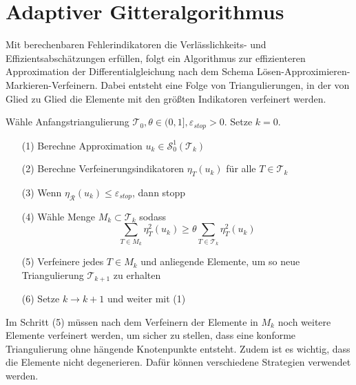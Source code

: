 \chapter{Adaptiver Gitteralgorithmus}
Mit berechenbaren Fehlerindikatoren die Verlässlichkeits- und Effizientsabschätzungen erfüllen, folgt ein Algorithmus zur effizienteren Approximation der Differentialgleichung nach dem Schema Lösen-Approximieren-Markieren-Verfeinern. Dabei entsteht eine Folge von Triangulierungen, in der von Glied zu Glied die Elemente mit den größten Indikatoren verfeinert werden.
\begin{algorithmus}
	Wähle Anfangstriangulierung $\mathscr{T}_0, \theta\in (0,1],\varepsilon_{stop}>0$. Setze $k=0$.
	\begin{itemize}
		\item[(1)] Berechne Approximation $u_k\in\mathscr{S}_0^1(\mathscr{T}_k)$
		\item[(2)] Berechne Verfeinerungsindikatoren $\eta_T(u_k)$ für alle $T\in\mathscr{T}_k$
		\item[(3)] Wenn $\eta_{\mathscr{R}}(u_k) \leq \varepsilon_{stop}$, dann stopp
		\item[(4)] Wähle Menge $M_k\subset\mathscr{T}_k$ sodass
		\[ \sum_{T\in M_k} \eta_T^2(u_k) \geq \theta\sum_{T\in\mathscr{T}_k}\eta_T^2(u_k)\]
		\item[(5)] Verfeinere jedes $T\in M_k$ und anliegende Elemente, um so neue Triangulierung $\mathscr{T}_{k+1}$ zu erhalten
		\item[(6)] Setze $k \rightarrow k + 1$ und weiter mit (1)
	\end{itemize}
\end{algorithmus}
Im Schritt (5) müssen nach dem Verfeinern der Elemente in $M_k$ noch weitere Elemente verfeinert werden, um sicher zu stellen, dass eine konforme Triangulierung ohne hängende Knotenpunkte entsteht. Zudem ist es wichtig, dass die Elemente nicht degenerieren. Dafür können verschiedene Strategien verwendet werden.


